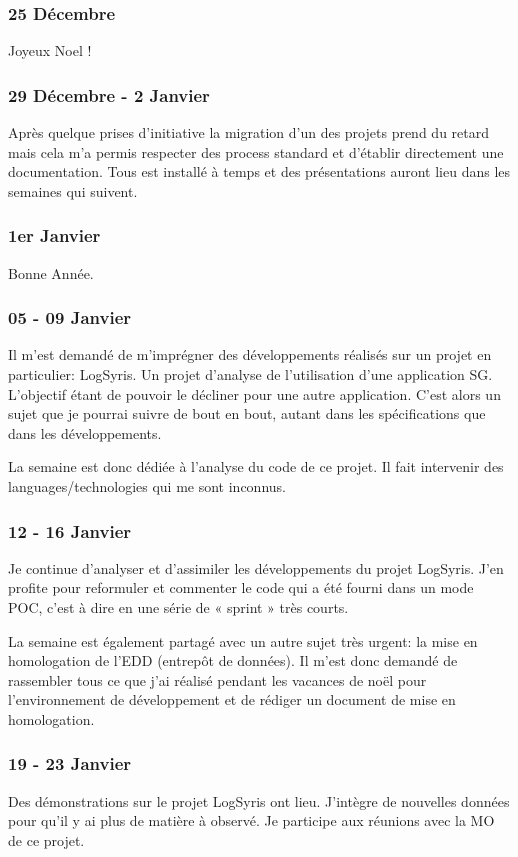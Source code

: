 \subsubsection*{25 Décembre }
Joyeux Noel !
\subsubsection*{29  Décembre - 2 Janvier}
Après quelque prises d’initiative la migration d’un des projets prend du retard mais cela m’a permis respecter des process standard et d’établir directement une documentation. Tous est installé à temps et des présentations auront lieu dans les semaines qui suivent.
\subsubsection*{1er Janvier}
Bonne Année.
\subsubsection*{05 - 09 Janvier}
Il m’est demandé de m’imprégner des développements réalisés sur un projet en particulier: LogSyris. Un projet d’analyse de l’utilisation d’une application SG. L’objectif étant de pouvoir le décliner pour une autre application. C’est alors un sujet que je pourrai suivre de bout en bout, autant dans les spécifications que dans les développements. 

La semaine est donc dédiée à l’analyse du code de ce projet. Il fait intervenir des languages/technologies qui me sont inconnus. 
\subsubsection*{12 - 16 Janvier}
Je continue d’analyser et d’assimiler les développements du projet LogSyris. J’en profite pour reformuler et commenter le code qui a été fourni dans un mode POC, c’est à dire en une série de « sprint » très courts.

La semaine est également partagé avec un autre sujet très urgent: la mise en homologation de l’EDD (entrepôt de données). Il m’est donc demandé de rassembler tous ce que j’ai réalisé pendant les vacances de noël pour l’environnement de développement et de rédiger un document de mise en homologation.
\subsubsection*{19 - 23 Janvier}
Des démonstrations sur le projet LogSyris ont lieu. J’intègre de nouvelles données pour qu’il y ai plus de matière à observé. Je participe aux réunions avec la MO de ce projet.

